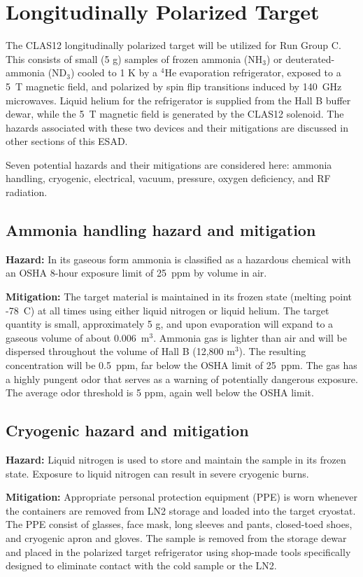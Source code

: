 
\section{ Longitudinally Polarized Target}

The CLAS12 longitudinally polarized target will be utilized for Run Group C.
This consists of small (5 g) samples of frozen ammonia (NH$_3$) or
deuterated-ammonia (ND$_3$) cooled to 1 K by a $^4$He evaporation refrigerator,
exposed to a 5~T magnetic field, and polarized by spin flip
transitions induced by 140~GHz microwaves.  Liquid helium for the refrigerator is supplied
from the Hall B buffer dewar, while the 5~T magnetic field
is generated by the CLAS12 solenoid.  The hazards associated with these two
devices and their mitigations are discussed in other sections of this ESAD.

Seven potential hazards and their mitigations are considered here: ammonia handling, cryogenic, electrical, vacuum, pressure, oxygen deficiency, and RF radiation.  

\subsection{Ammonia handling hazard and mitigation} 
{\bf Hazard:} In its gaseous form ammonia is classified as a hazardous chemical with an OSHA 8-hour exposure limit of 25~ppm by volume in air.  

{\bf Mitigation:} The target material is maintained in its frozen state (melting point -78~C) at all times using either liquid nitrogen or liquid helium.  The target quantity is small, approximately 5 g, and upon evaporation will expand to a gaseous volume of about 0.006~m$^3$.  Ammonia gas is lighter than air and will be dispersed throughout the volume of Hall B (12,800 m$^3$).  The resulting concentration will be 0.5~ppm, far below the OSHA limit of 25~ppm.  The gas has a highly pungent odor that serves as a warning of potentially dangerous exposure. The average odor threshold is 5 ppm, again well below the OSHA limit.

\subsection{Cryogenic hazard and mitigation}
 {\bf Hazard:} Liquid nitrogen is used to store and maintain the sample in its frozen state.  Exposure to liquid nitrogen can result in severe cryogenic burns.  
  
{\bf Mitigation:} Appropriate personal protection equipment (PPE) is worn whenever the containers are removed from LN2 storage and loaded into the target cryostat.   The PPE consist of glasses, face mask, long sleeves and pants, closed-toed shoes, and cryogenic apron and gloves. The sample is removed from the storage dewar and placed in the polarized target refrigerator using shop-made tools specifically designed to eliminate contact with the cold sample or the LN2.  


